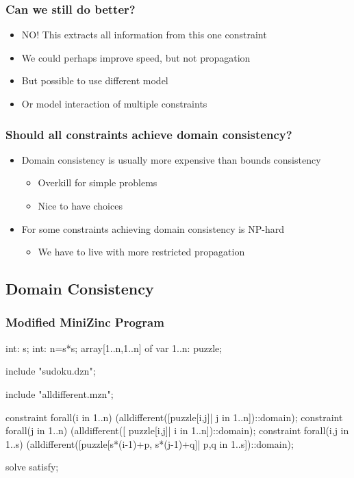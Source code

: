 \begin{frame}
\frametitle{Can we still do better?}
\begin{itemize}
\item NO! This extracts all information from this one constraint
\item We could perhaps improve speed, but not propagation
\item But possible to use different model
\item Or model interaction of multiple constraints
\end{itemize}
\end{frame}

\begin{frame}
\frametitle{Should all constraints achieve domain consistency?}
\begin{itemize}
\item Domain consistency is usually more expensive than bounds consistency
\begin{itemize}
\item Overkill for simple problems
\item Nice to have choices
\end{itemize}
\item For some constraints achieving domain consistency is NP-hard
\begin{itemize}
\item We have to live with more restricted propagation
\end{itemize}
\end{itemize}
\end{frame}


\subsection{Domain Consistency}

\begin{frame}[fragile]
  \frametitle{Modified MiniZinc Program}
  \label{sudoku:minizinc mod}
  \small
\begin{semiverbatim}
int: s;
int: n=s*s;
array[1..n,1..n] of var 1..n: puzzle;

include "sudoku.dzn";

include "alldifferent.mzn";

constraint forall(i in 1..n)
    (alldifferent([puzzle[i,j]| j in 1..n])::domain);
constraint forall(j in 1..n)
    (alldifferent([ puzzle[i,j]| i in 1..n])::domain);
constraint forall(i,j in 1..s)
    (alldifferent([puzzle[s*(i-1)+p, s*(j-1)+q]|
                  p,q in 1..s])::domain);

solve satisfy;
\end{semiverbatim}
\end{frame}

